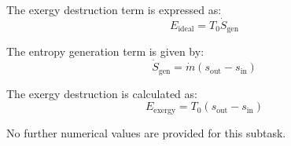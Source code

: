 The exergy destruction term is expressed as:  
\[
E_{\text{ideal}} = T_0 \dot{S}_{\text{gen}}
\]  

The entropy generation term is given by:  
\[
\dot{S}_{\text{gen}} = \dot{m} \left( s_{\text{out}} - s_{\text{in}} \right)
\]  

The exergy destruction is calculated as:  
\[
E_{\text{exergy}} = T_0 \left( s_{\text{out}} - s_{\text{in}} \right)
\]  

No further numerical values are provided for this subtask.